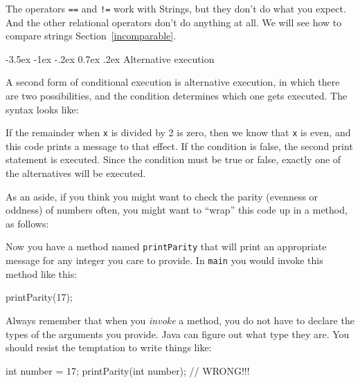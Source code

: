 \documentclass{book}
\makeatletter
\renewcommand{\section}{\@startsection 
    {section} {1} {0mm}%
    {-3.5ex \@plus -1ex \@minus -.2ex}%
    {0.7ex \@plus.2ex}%
    {\normalfont\Large\bfseries}}
\makeatother
\begin{document}
The operators {\tt ==} and {\tt !=} work with Strings, but they
don't do what you expect.  And the other relational operators
don't do anything at all.
We will see how to compare strings Section~\ref{incomparable}.


\section {Alternative execution}
\label{alternative}

A second form of conditional execution is alternative execution,
in which there are two possibilities, and the condition determines
which one gets executed.  The syntax looks like:

%
If the remainder when {\tt x} is divided by 2 is zero, then
we know that {\tt x} is even, and this code prints a message
to that effect.  If the condition is false, the second
print statement is executed.  Since the condition must
be true or false, exactly one of the alternatives will be
executed.

As an aside, if you think you might want to check the parity
(evenness or oddness) of numbers often, you might want to
``wrap'' this code up in a method, as follows:

%
Now you have a method named {\tt printParity} that will print
an appropriate message for any integer you care to provide.
In {\tt main} you would invoke this method like this:

\begin{verbatimtab}
    printParity(17);
\end{verbatimtab}
%
Always remember that when you {\em invoke} a method, you do
not have to declare the types of the arguments you provide.
Java can figure out what type they are.  You should resist the
temptation to write things like:

\begin{verbatimtab}
    int number = 17;
    printParity(int number);         // WRONG!!!
\end{verbatimtab}
\end{document}
